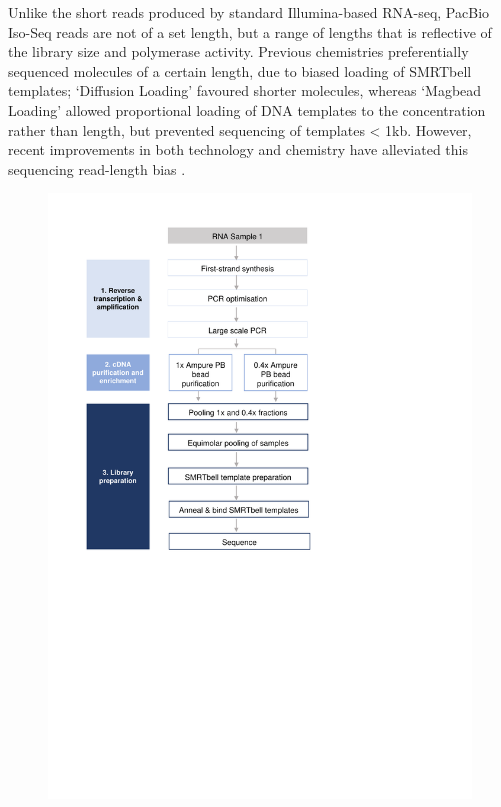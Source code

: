 Unlike the short reads produced by standard Illumina-based RNA-seq, PacBio Iso-Seq reads are not of a set length, but a range of lengths that is reflective of the library size and polymerase activity\cite{Ardui2018,Rhoads2015}. Previous chemistries preferentially sequenced molecules of a certain length, due to biased loading of SMRTbell templates; ‘Diffusion Loading' favoured shorter molecules\cite{Loomis2013}, whereas ‘Magbead Loading' allowed proportional loading of DNA templates to the concentration rather than length, but prevented sequencing of templates < 1kb. However, recent improvements in both technology and chemistry have alleviated this sequencing read-length bias \cite{Oikonomopoulos2020}.

\begin{figure}[!h]
	\centering
	\includegraphics[page=14,trim={0 5cm 0 0 },clip, scale = 0.7]{Figures/ProjectDevelopment_Figures.pdf}

\end{figure}
